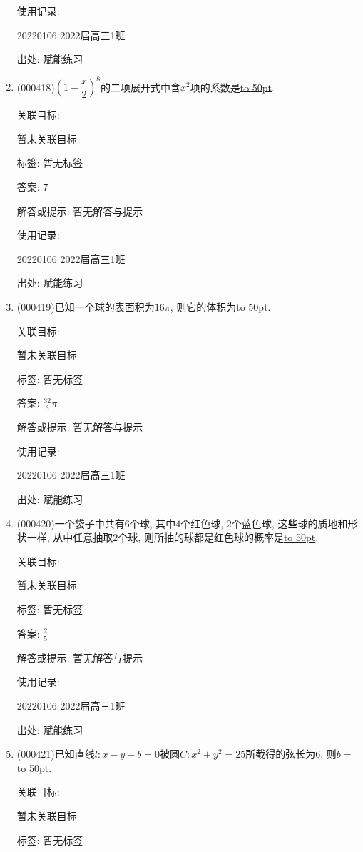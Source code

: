 \documentclass[10pt,a4paper]{article}
\newcommand{\blank}[1]{\underline{\hbox to #1pt{}}}
\begin{document}
\begin{enumerate}[1.]
使用记录:

20220106	2022届高三1班	


出处: 赋能练习
\item { (000418)}$(1-\dfrac x2)^8$的二项展开式中含$x^2$项的系数是\blank{50}.


关联目标:

暂未关联目标



标签: 暂无标签

答案: $7$

解答或提示: 暂无解答与提示

使用记录:

20220106	2022届高三1班	


出处: 赋能练习
\item { (000419)}已知一个球的表面积为$16\pi$, 则它的体积为\blank{50}.


关联目标:

暂未关联目标



标签: 暂无标签

答案: $\frac{32}3\pi$

解答或提示: 暂无解答与提示

使用记录:

20220106	2022届高三1班	


出处: 赋能练习
\item { (000420)}一个袋子中共有$6$个球, 其中$4$个红色球, $2$个蓝色球, 这些球的质地和形状一样, 从中任意抽取$2$个球, 则所抽的球都是红色球的概率是\blank{50}.


关联目标:

暂未关联目标



标签: 暂无标签

答案: $\frac 25$

解答或提示: 暂无解答与提示

使用记录:

20220106	2022届高三1班	


出处: 赋能练习
\item { (000421)}已知直线$l:x-y+b=0$被圆$C:x^2+y^2=25$所截得的弦长为$6$, 则$b=$\blank{50}.


关联目标:

暂未关联目标



标签: 暂无标签


\end{enumerate}
\end{document}
